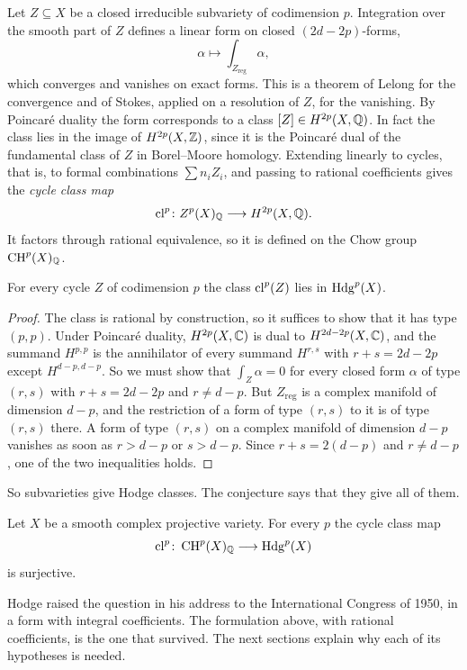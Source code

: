 Let $Z\subseteq X$ be a closed irreducible subvariety of codimension $p$.
Integration over the smooth part of $Z$ defines a linear form on closed
$(2d-2p)$-forms,
\[
  \alpha\longmapsto\int_{Z_{\mathrm{reg}}}\alpha ,
\]
which converges and vanishes on exact forms. This is a theorem of Lelong
for the convergence and of Stokes, applied on a resolution of $Z$, for the
vanishing. By Poincar\'e duality the form corresponds to a class
$[Z]\in H^{2p}(X,\mathbb{Q})$. In fact the class lies in the image of
$H^{2p}(X,\mathbb{Z})$, since it is the Poincar\'e dual of the fundamental class
of $Z$ in Borel--Moore homology. Extending linearly to cycles, that is, to
formal combinations $\sum n_{i}Z_{i}$, and passing to rational
coefficients gives the \emph{cycle class map}
\[
  \operatorname{cl}^{p}\colon Z^{p}(X)_{\mathbb{Q}}\longrightarrow H^{2p}(X,\mathbb{Q}).
\]
It factors through rational equivalence, so it is defined on the Chow
group $\operatorname{CH}^{p}(X)_{\mathbb{Q}}$.

\begin{proposition}\label{prop:classispp}
For every cycle $Z$ of codimension $p$ the class $\operatorname{cl}^{p}(Z)$ lies in
$\operatorname{Hdg}^{p}(X)$.
\end{proposition}

\begin{proof}
The class is rational by construction, so it suffices to show that it has
type $(p,p)$. Under Poincar\'e duality,
$H^{2p}(X,\mathbb{C})$ is dual to $H^{2d-2p}(X,\mathbb{C})$, and the summand
$H^{p,p}$ is the annihilator of every summand $H^{r,s}$ with $r+s=2d-2p$
except $H^{d-p,d-p}$. So we must show that $\int_{Z}\alpha=0$ for every
closed form $\alpha$ of type $(r,s)$ with $r+s=2d-2p$ and $r\ne d-p$. But
$Z_{\mathrm{reg}}$ is a complex manifold of dimension $d-p$, and the
restriction of a form of type $(r,s)$ to it is of type $(r,s)$ there. A form
of type $(r,s)$ on a complex manifold of dimension $d-p$ vanishes as soon
as $r>d-p$ or $s>d-p$. Since $r+s=2(d-p)$ and $r\ne d-p$, one of the two
inequalities holds.
\end{proof}

So subvarieties give Hodge classes. The conjecture says that they give all
of them.

\begin{conjecture}[Hodge]\label{conj:hodge}
Let $X$ be a smooth complex projective variety. For every $p$ the cycle
class map
\[
  \operatorname{cl}^{p}\colon\operatorname{CH}^{p}(X)_{\mathbb{Q}}\longrightarrow\operatorname{Hdg}^{p}(X)
\]
is surjective.
\end{conjecture}

Hodge raised the question in his address to the International Congress of
1950, in a form with integral coefficients. The formulation above, with
rational coefficients, is the one that survived. The next
sections explain why each of its hypotheses is needed.


